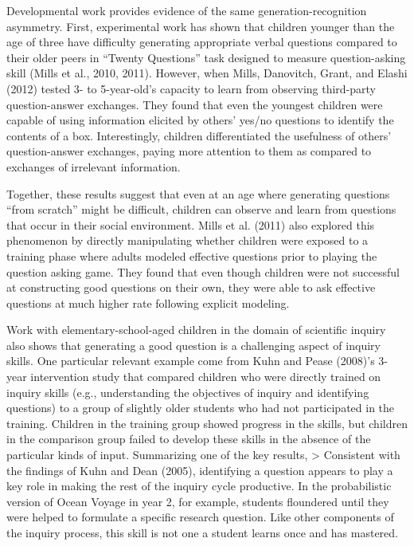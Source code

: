 \documentclass[english,floatsintext,man]{apa6}
\theoremstyle{definition}
\theoremstyle{definition}
\theoremstyle{definition}
\theoremstyle{remark}
\begin{document}
Developmental work provides evidence of the same generation-recognition
asymmetry. First, experimental work has shown that children younger than
the age of three have difficulty generating appropriate verbal questions
compared to their older peers in \enquote{Twenty Questions} task
designed to measure question-asking skill (Mills et al., 2010, 2011).
However, when Mills, Danovitch, Grant, and Elashi (2012) tested 3- to
5-year-old's capacity to learn from observing third-party
question-answer exchanges. They found that even the youngest children
were capable of using information elicited by others' yes/no questions
to identify the contents of a box. Interestingly, children
differentiated the usefulness of others' question-answer exchanges,
paying more attention to them as compared to exchanges of irrelevant
information.

Together, these results suggest that even at an age where generating
questions \enquote{from scratch} might be difficult, children can
observe and learn from questions that occur in their social environment.
Mills et al. (2011) also explored this phenomenon by directly
manipulating whether children were exposed to a training phase where
adults modeled effective questions prior to playing the question asking
game. They found that even though children were not successful at
constructing good questions on their own, they were able to ask
effective questions at much higher rate following explicit modeling.

Work with elementary-school-aged children in the domain of scientific
inquiry also shows that generating a good question is a challenging
aspect of inquiry skills. One particular relevant example come from Kuhn
and Pease (2008)'s 3-year intervention study that compared children who
were directly trained on inquiry skills (e.g., understanding the
objectives of inquiry and identifying questions) to a group of slightly
older students who had not participated in the training. Children in the
training group showed progress in the skills, but children in the
comparison group failed to develop these skills in the absence of the
particular kinds of input. Summarizing one of the key results,
\textgreater{} Consistent with the findings of Kuhn and Dean (2005),
identifying a question appears to play a key role in making the rest of
the inquiry cycle productive. In the probabilistic version of Ocean
Voyage in year 2, for example, students floundered until they were
helped to formulate a specific research question. Like other components
of the inquiry process, this skill is not one a student learns once and
has mastered.
\end{document}
